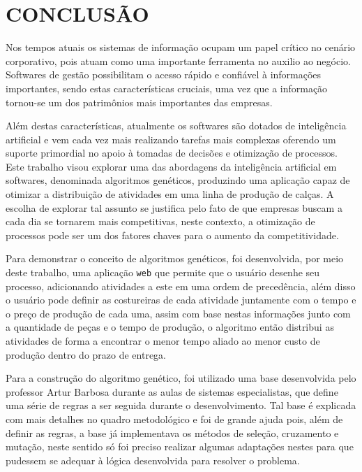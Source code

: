 
\chapter{CONCLUSÃO} 

\par Nos tempos atuais os sistemas de informação ocupam um papel crítico no cenário corporativo, pois
atuam como uma importante ferramenta no auxilio ao negócio. Softwares de gestão possibilitam
o acesso rápido e confiável à informações importantes, sendo estas características cruciais, uma vez que a 
informação tornou-se um dos patrimônios mais importantes das empresas. 

\par Além destas características, atualmente os softwares são dotados de inteligência artificial e vem cada vez 
mais realizando tarefas mais complexas oferendo um suporte primordial no apoio à tomadas de decisões e otimização 
de processos. Este trabalho visou explorar uma das abordagens da inteligência artificial em softwares, denominada 
algoritmos genéticos, produzindo uma aplicação capaz de otimizar a distribuição de atividades em uma linha de produção 
de calças. A escolha de explorar tal assunto se justifica pelo fato de que empresas buscam a cada dia se tornarem mais 
competitivas, neste contexto, a otimização de processos pode ser um dos fatores chaves para o aumento da competitividade.

\par Para demonstrar o conceito de algoritmos genéticos, foi desenvolvida, por meio deste trabalho, uma aplicação 
\texttt{web} que permite que o usuário desenhe seu processo, adicionando atividades a este em uma ordem de precedência,
além disso o usuário pode definir as costureiras de cada atividade juntamente com o tempo e o preço de produção de cada uma, assim 
com base nestas informações junto com a quantidade de peças e o tempo de produção, o algoritmo então distribui as atividades de 
forma a encontrar o menor tempo aliado ao menor custo de produção dentro do prazo de entrega. 

\par Para a construção do algoritmo genético, foi utilizado uma base desenvolvida pelo professor Artur Barbosa 
durante as aulas de sistemas especialistas, que define uma série de regras a ser seguida durante o desenvolvimento. 
Tal base é explicada com mais detalhes no quadro metodológico e foi de grande ajuda pois, além de definir as
regras, a base já implementava os métodos de seleção, cruzamento e mutação, neste sentido só foi preciso realizar algumas 
adaptações nestes para que pudessem se adequar à lógica desenvolvida para resolver o problema.

